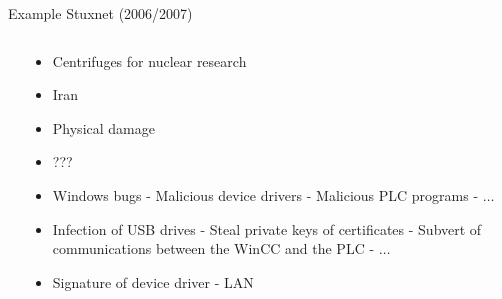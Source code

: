 \documentclass{beamer}
\begin{document}
\begin{frame}{Example Stuxnet (2006/2007)}
\begin{columns}[onlytextwidth]
\begin{column}{0.4\textwidth}
  \end{column}

    \begin{column}{0.6\textwidth}
  \begin{itemize}
  \item<1-> Centrifuges for nuclear research
  \item<2-> Iran
  \item<3-> Physical damage
  \item<4-> ???
  \item<5-> Windows bugs -
    Malicious device drivers - 
    Malicious PLC programs - $\dots$
  \item<7-> Infection of USB drives - Steal private keys of certificates - Subvert of communications between the WinCC and the PLC - $\dots$
  \item<6->  Signature of device driver - LAN
  \end{itemize}
  \end{column}
\end{columns}
\end{frame}


      
\end{document}

